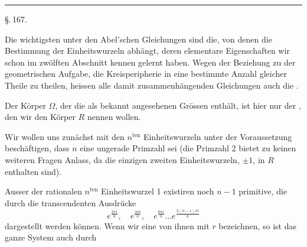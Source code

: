 \begin{center}


\rule{3cm}{0.4pt}

\S.\,167.

\end{center}

Die wichtigsten unter den Abel'schen Gleichungen sind die, von denen die Bestimmung der Einheitswurzeln abhängt, deren elementare Eigenschaften wir schon im zwölften Abschnitt kennen gelernt haben. Wegen der Beziehung zu der geometrischen Aufgabe, die Kreisperipherie in eine bestimmte Anzahl gleicher Theile zu theilen, heissen alle damit zusammenhängenden Gleichungen auch die .

Der Körper $\Omega$, der die als bekannt angesehenen Grössen enthält, ist hier nur der , den wir den Körper $R$ nennen wollen.

Wir wollen uns zunächst mit den $n^{\text{ten}}$ Einheitswurzeln unter der Voraussetzung beschäftigen, dass $n$ eine ungerade Primzahl sei (die Primzahl 2 bietet zu keinen weiteren Fragen Anlass, da die einzigen zweiten Einheitswurzeln, $\pm 1$, in $R$ enthalten sind).

Ausser der rationalen $n^{\text{ten}}$ Einheitswurzel 1 existiren noch $n - 1$ primitive, die durch die transcendenten Ausdrücke
\[
e^{\frac{2\pi i}{n}}, \quad e^{\frac{4\pi i}{n}}, \quad e^{\frac{6\pi i}{n}} \dots e^{\frac{2(n-1)\pi i}{n}}
\]
dargestellt werden können. Wenn wir eine von ihnen mit $r$ bezeichnen, so ist das ganze System auch durch
